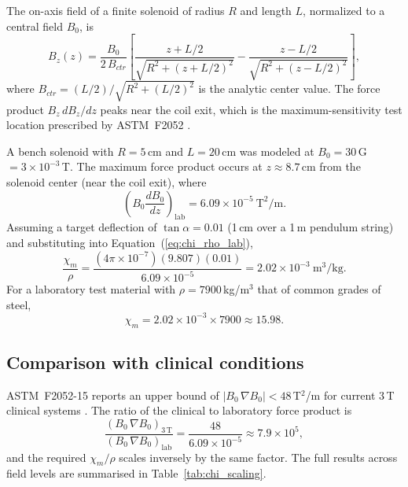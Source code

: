The on-axis field of a finite solenoid of radius $R$ and length $L$,
normalized to a central field $B_0$, is
\begin{equation}
	B_z(z) = \frac{B_0}{2\,B_{ctr}}
	\left[
	\frac{z + L/2}{\sqrt{R^2+(z+L/2)^2}}
	-
	\frac{z - L/2}{\sqrt{R^2+(z-L/2)^2}}
	\right],
\end{equation}
where $B_{ctr} = (L/2)\big/\sqrt{R^2+(L/2)^2}$ is the analytic
center value. The force product $B_z\,dB_z/dz$ peaks near the coil exit,
which is the maximum-sensitivity test location prescribed by
ASTM~F2052 \cite{astmF2052}.

A bench solenoid with $R = 5$\,cm and $L = 20$\,cm was modeled at
$B_0 = 30$\,G $= 3\times10^{-3}$\,T. The maximum force product occurs at
$z \approx 8.7$\,cm from the solenoid center (near the coil exit), where
\begin{equation}
	\left(B_0\frac{dB_0}{dz}\right)_{\!\mathrm{lab}}
	= 6.09\times10^{-5}\ \mathrm{T^2/m}.
\end{equation}
Assuming a target deflection of $\tan\alpha = 0.01$ (1\,cm over a 1\,m
pendulum string) and substituting into Equation~(\ref{eq:chi_rho_lab}),
\begin{equation}
	\frac{\chi_m}{\rho}
	= \frac{(4\pi\times10^{-7})(9.807)(0.01)}{6.09\times10^{-5}}
	= 2.02\times10^{-3}\ \mathrm{m^3/kg}.
\end{equation}
For a laboratory test material with $\rho = 7900$\,kg/m$^3$ that of common grades of steel,
\begin{equation}
	\chi_m = 2.02\times10^{-3} \times 7900 \approx 15.98.
\end{equation}

\subsection*{Comparison with clinical conditions}

ASTM~F2052-15 reports an upper bound of
$|B_0\,\nabla B_0| < 48$\,T$^2$/m for current 3\,T clinical
systems \cite{astmF2052}. The ratio of the clinical to laboratory force
product is
\begin{equation}
	\frac{\left(B_0\,\nabla B_0\right)_{\!3\,\mathrm{T}}}
	{\left(B_0\,\nabla B_0\right)_{\!\mathrm{lab}}}
	= \frac{48}{6.09\times10^{-5}}
	\approx 7.9\times10^{5},
\end{equation}
and the required $\chi_m/\rho$ scales inversely by the same factor. The
full results across field levels are summarised in
Table~\ref{tab:chi_scaling}.

